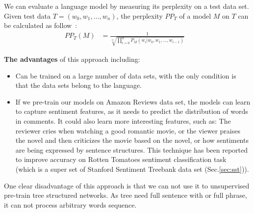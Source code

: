 We can evaluate a language model by measuring its perplexity on a test data set. Given test data \(T = (w_0, w_1,\ldots,w_n)\), the perplexity \(PP_T\) of a model \(M\) on \(T\) can be calculated as follow~\cite{perplexity}:
\begin{align}
    PP_T(M) &= \frac{1}{\sqrt[n]{\prod_{i=0}^{n} P_M(w_{i}|w_0, w_1,\ldots,w_{i-1})}}&
\end{align}

\label{lm-hypothesis}
\textbf{The advantages} of this approach including:
\begin{itemize}
\item Can be trained on a large number of data sets, with the only condition is that the data sets belong to the language.
\label{unproved:unsupervised-good}
\item If we pre-train our models on Amazon Reviews data set, the models can learn to capture sentiment features, as it needs to predict the distribution of words in comments.
It could also learn more interesting features, such as:
The reviewer cries when watching a good romantic movie, or the viewer praises the novel and then criticizes the movie based on the novel, or how sentiments are being expressed by sentence structures.
This technique has been reported to improve accuracy on Rotten Tomatoes sentiment classification task~\cite{Rotten-Tomato} (which is a super set of Stanford Sentiment Treebank data set (Sec.\ref{sec:sst})).
\end{itemize}

One clear disadvantage of this approach is that we can not use it to unsupervised pre-train tree structured networks.
As tree need full sentence with or full phrase, it can not process arbitrary words sequence.

